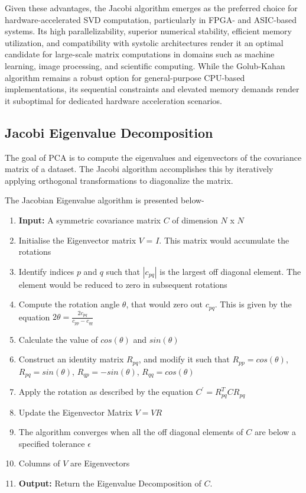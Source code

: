 Given these advantages, the Jacobi algorithm emerges as the preferred choice for hardware-accelerated SVD computation, particularly in FPGA- and ASIC-based systems. Its high parallelizability, superior numerical stability, efficient memory utilization, and compatibility with systolic architectures render it an optimal candidate for large-scale matrix computations in domains such as machine learning, image processing, and scientific computing. While the Golub-Kahan algorithm remains a robust option for general-purpose CPU-based implementations, its sequential constraints and elevated memory demands render it suboptimal for dedicated hardware acceleration scenarios.

\subsection{Jacobi Eigenvalue Decomposition}
The goal of PCA is to compute the eigenvalues and eigenvectors of the covariance matrix of a dataset. The Jacobi algorithm accomplishes this by iteratively applying orthogonal transformations to diagonalize the matrix.

The Jacobian Eigenvalue algorithm is presented below-
\begin{enumerate}
	\item \textbf{Input:} A symmetric covariance matrix \( C \) of dimension \( N \) x \( N \)
	\item Initialise the Eigenvector matrix \( V \) = \( I \). This matrix would accumulate the rotations
	\item Identify indices \( p \) and \( q \) such that  \( |c_{pq}| \) is the largest off diagonal element. The element would be reduced to zero in subsequent rotations
	\item Compute the rotation angle \( \theta \), that would zero out \( c_{pq} \). This is given by the equation \( 2\theta = \frac{2c_{pq}}{c_{pp} - c_{qq}} \)
	\item Calculate the value of \( cos(\theta) \) and \( sin(\theta) \)
	\item Construct an identity matrix \( R_{pq} \), and modify it such that \( R_{pp} = cos(\theta) \), \( R_{pq} = sin(\theta) \), \( R_{qp} = -sin(\theta) \), \( R_{qq} = cos(\theta) \)
	\item Apply the rotation as described by the equation \( C^{'} = R^{T}_{pq}CR_{pq} \)
	\item Update the Eigenvector Matrix \( V = VR \)
	\item The algorithm converges when all the off diagonal elements of \( C \) are below a specified tolerance \( \epsilon \)
	\item Columns of \( V \) are Eigenvectors
	\item \textbf{Output:} Return the Eigenvalue Decomposition of \( C \).
\end{enumerate}

